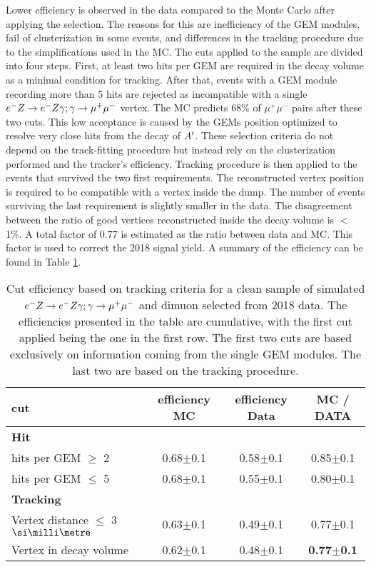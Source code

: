Lower efficiency is observed in the data compared to the Monte Carlo after applying the selection. The reasons for this are inefficiency of the GEM modules, fail of clusterization in some events, and differences in the tracking procedure due to the simplifications used in the MC. The cuts applied to the sample are divided into four steps. First, at least two hits per GEM are required in the decay volume as a minimal condition for tracking. After that, events with a GEM module recording more than 5 hits are rejected as incompatible with a single $e^- Z \to e^- Z \gamma; \gamma \to \mu^+ \mu^-$ vertex. The MC predicts 68\% of $\mu^+ \mu^-$ pairs after these two cuts. This low acceptance is caused by the GEMs position optimized to resolve very close hits from the decay of $A'$. These selection criteria do not depend on the track-fitting procedure but instead rely on the clusterization performed and the tracker's efficiency. Tracking procedure is then applied to the events that survived the two first requirements. The reconstructed vertex position is required to be compatible with a vertex inside the dump. The number of events surviving the last requirement is slightly smaller in the data. 
The disagreement between the ratio of good vertices reconstructed inside the decay volume is $<$1\%. A total factor of 0.77 is estimated as the ratio between data and MC. This factor is used to correct the 2018 signal yield. A summary of the efficiency can be found in Table \ref{tab:dimuon:efficiencies}.

\begin{center}
\begin{table}
  \begin{tabular}{|l|c|c|c|}
    \hline
    cut & efficiency MC & efficiency Data & MC / DATA \\
    \hline
    \multicolumn{4}{|l|}{\textbf{Hit}}\\
    \hline
    hits per GEM $\geq$ 2 & 0.68$\pm$0.1 & 0.58$\pm$0.1 & 0.85$\pm$0.1 \\
    hits per GEM $\leq$ 5 & 0.68$\pm$0.1 & 0.55$\pm$0.1 & 0.80$\pm$0.1 \\
    \hline
    \multicolumn{4}{|l|}{\textbf{Tracking}}\\    
    \hline
    Vertex distance $\leq$ 3 $\mmi$ & 0.63$\pm$0.1 & 0.49$\pm$0.1 & 0.77$\pm$0.1  \\
    Vertex in decay volume & 0.62$\pm$0.1 & 0.48$\pm$0.1 & \textbf{0.77$\pm$0.1}\\
    \hline
    
  \end{tabular}
  \caption[MC/DATA for the tracking procedure and vertex reconstruction]{Cut efficiency based on tracking criteria for a clean sample of simulated $e^- Z \to e^- Z \gamma; \gamma \to \mu^+ \mu^-$ and dimuon selected from 2018 data. The efficiencies presented in the table are cumulative, with the first cut applied being the one in the first row. The first two cuts are based exclusively on information coming from the single GEM modules. The last two are based on the tracking procedure.}
  \label{tab:dimuon:efficiencies}
\end{table}
\end{center}

